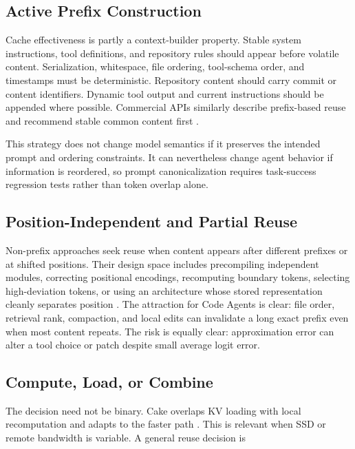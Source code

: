 \documentclass[conference,10pt]{IEEEtran}
\begin{document}
\subsection{Active Prefix Construction}

Cache effectiveness is partly a context-builder property. Stable system instructions, tool definitions, and repository rules should appear before volatile content. Serialization, whitespace, file ordering, tool-schema order, and timestamps must be deterministic. Repository content should carry commit or content identifiers. Dynamic tool output and current instructions should be appended where possible. Commercial APIs similarly describe prefix-based reuse and recommend stable common content first \cite{d09openai,d10anthropic,d12google,d13deepseek}.

This strategy does not change model semantics if it preserves the intended prompt and ordering constraints. It can nevertheless change agent behavior if information is reordered, so prompt canonicalization requires task-success regression tests rather than token overlap alone.

\subsection{Position-Independent and Partial Reuse}

Non-prefix approaches seek reuse when content appears after different prefixes or at shifted positions. Their design space includes precompiling independent modules, correcting positional encodings, recomputing boundary tokens, selecting high-deviation tokens, or using an architecture whose stored representation cleanly separates position \cite{gim2023prompt,hu2024epic,ma2026irminsul}. The attraction for Code Agents is clear: file order, retrieval rank, compaction, and local edits can invalidate a long exact prefix even when most content repeats. The risk is equally clear: approximation error can alter a tool choice or patch despite small average logit error.

\subsection{Compute, Load, or Combine}

The decision need not be binary. Cake overlaps KV loading with local recomputation and adapts to the faster path \cite{jin2024compute}. This is relevant when SSD or remote bandwidth is variable. A general reuse decision is
\end{document}

